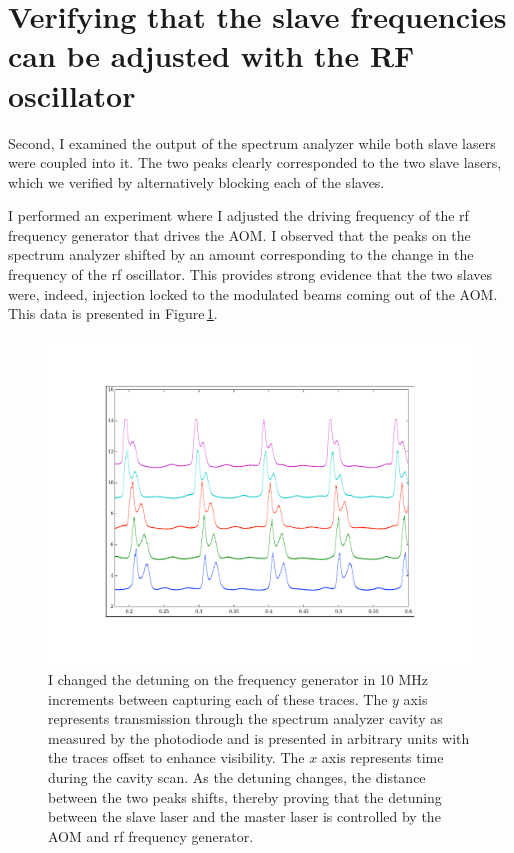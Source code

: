 \section{Verifying that the slave frequencies can be adjusted with the RF oscillator}
Second, I examined the output of the spectrum analyzer while both slave lasers were coupled into it. 
The two peaks clearly corresponded to the two slave lasers, which we verified by alternatively blocking each of the slaves. 


I performed an experiment where I adjusted the driving frequency of the rf frequency generator that drives the AOM. I observed that the peaks on the spectrum analyzer shifted by an amount corresponding to the change in the frequency of the rf oscillator. This provides strong evidence that the two slaves were, indeed, injection locked to the modulated beams coming out of the AOM. This data is presented in Figure\,\ref{fig:typicaldata}.


 
\begin{figure}
    \centerline{\includegraphics{sampleOffsetData}}
    \caption[Relative detuning of slave lasers for different rf oscillator frequencies]{\label{fig:typicaldata}
    I changed the detuning on the frequency generator in 10 MHz increments between capturing each of these traces. The $y$ axis represents transmission through the spectrum analyzer cavity as measured by the photodiode and is presented in arbitrary units with the traces offset to enhance visibility. The $x$ axis represents time during the cavity scan. As the detuning changes, the distance between the two peaks shifts, thereby proving that the detuning between the slave laser and the master laser is controlled by the AOM and rf frequency generator.}
\end{figure}

